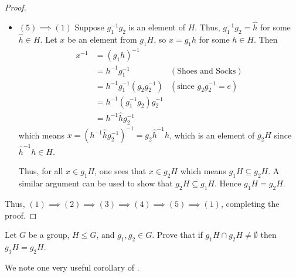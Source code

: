 \begin{proof}
\begin{itemize}
        \item $\boxed{(5) \implies (1)}$
        Suppose $g_1^{-1}g_2$ is an element of $H$. Thus, $g_1^{-1}g_2 = \hat{h}$ for some $\hat{h} \in H$. Let $x$ be an element from $g_1H$, so $x = g_1h$ for some $h \in H$. Then
        \begin{align*}
            x^{-1} &= (g_1h)^{-1}\\
            &= h^{-1}g_1^{-1} & (\text{Shoes and Socks})\\
            &= h^{-1}g_1^{-1}(g_2g_2^{-1}) & (\text{since }g_2g_2^{-1} = e)\\
            &= h^{-1}(g_1^{-1}g_2)g_2^{-1}\\
            &= h^{-1}\hat{h}g_2^{-1}
        \end{align*}
        which means $x = \left(h^{-1}\hat{h}g_2^{-1}\right)^{-1} = g_2\hat{h}^{-1}h$, which is an element of $g_2H$ since $\hat{h}^{-1}h \in H$.

        Thus, for all $x \in g_1H$, one sees that $x \in g_2H$ which means $g_1H \subseteq g_2H$. A similar argument can be used to show that $g_2H \subseteq g_1H$. Hence $g_1H = g_2H$.
    \end{itemize}

    Thus, $(1) \implies (2) \implies (3) \implies (4) \implies (5) \implies (1)$, completing the proof.
\end{proof}

\begin{exercise}\label{exercise-intersection-of-distinct-cosets-is-empty}
    Let $G$ be a group, $H \leq G$, and $g_1, g_2 \in G$. Prove that if $g_1H \cap g_2H \neq \emptyset$ then $g_1H = g_2H$.
\end{exercise}

We note one very useful corollary of .


